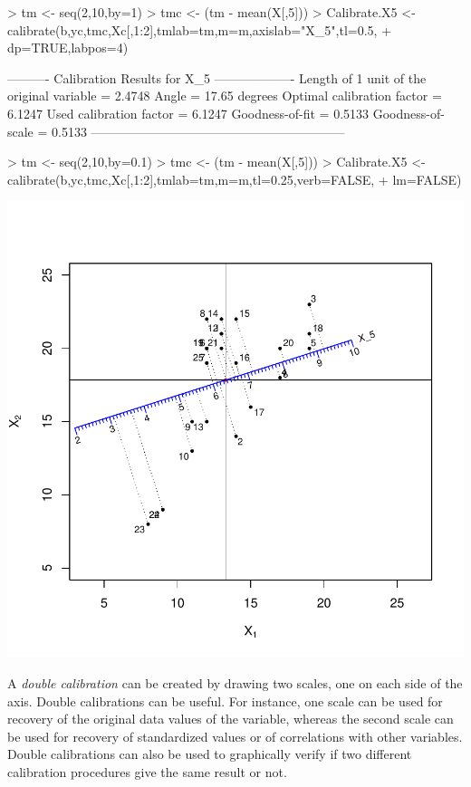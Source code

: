 \documentclass[a4paper]{article}
\begin{document}
\begin{Schunk}
\begin{Sinput}
> tm <- seq(2,10,by=1)
> tmc <- (tm - mean(X[,5]))
> Calibrate.X5 <- calibrate(b,yc,tmc,Xc[,1:2],tmlab=tm,m=m,axislab="X_5",tl=0.5,
+                           dp=TRUE,labpos=4)
\end{Sinput}
\begin{Soutput}
---------- Calibration Results for  X_5  -------------------
Length of 1 unit of the original variable =  2.4748  
Angle                                     =  17.65 degrees
Optimal calibration factor                =  6.1247  
Used calibration factor                   =  6.1247  
Goodness-of-fit                           =  0.5133  
Goodness-of-scale                         =  0.5133  
------------------------------------------------------------
\end{Soutput}
\begin{Sinput}
> tm <- seq(2,10,by=0.1)
> tmc <- (tm - mean(X[,5]))
> Calibrate.X5 <- calibrate(b,yc,tmc,Xc[,1:2],tmlab=tm,m=m,tl=0.25,verb=FALSE,
+                           lm=FALSE)
\end{Sinput}
\end{Schunk}
\includegraphics{CalibrationGuide-009}

A {\it double calibration} can be created by drawing two scales, one on each side of the axis. Double
calibrations can be useful. For instance, one scale can be used for recovery of the original 
data values of the variable, whereas the second scale can be used for recovery of standardized values or
of correlations with other variables. Double calibrations can also be used to 
graphically verify if two different calibration procedures give the same result or not. 
\end{document}
